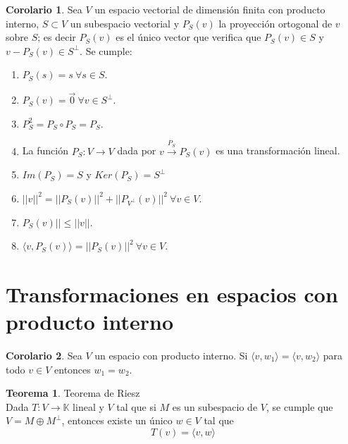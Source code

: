 \documentclass[10pt]{article}
\theoremstyle{definition}
\newtheorem{theorem}{Teorema}[section]
\newtheorem{corollary}{Corolario}[theorem]
\begin{document}
\begin{corollary}
    Sea $V$ un espacio vectorial de dimensión finita con producto interno, $S\subset V$ un subespacio vectorial y $P_S(v)$ la proyección ortogonal de $v$ sobre $S$; es decir $P_S(v)$ es el único vector que verifica que $P_S(v)\in S$ y $v-P_S(v)\in S^\bot$. Se cumple:
    \begin{enumerate}
        \item $P_S(s)=s\ \forall s\in S$.
        \item $P_S(v)=\vec{0}\ \forall v\in S^\bot$.
        \item $P_S^2=P_S\circ P_S=P_S$.
        \item La función $P_S:V\to V$ dada por $v\xrightarrow{P_{S}} P_{S}( v)$ es una transformación lineal.
        \item $Im(P_S)=S$ y $Ker(P_S)=S^\bot$
        \item $||v||^2=||P_S(v)||^2+||P_{V^\bot}(v)||^2\ \forall v\in V$.
        \item $P_S(v)||\le ||v||$.
        \item $\langle v,P_S(v)\rangle = ||P_S(v)||^2\ \forall v\in V$.
    \end{enumerate}
\end{corollary}\newpage
\section{Transformaciones en espacios con producto interno}
\begin{corollary}
    Sea $V$ un espacio con producto interno. Si $\langle v,w_1\rangle=\langle v,w_2\rangle$ para todo $v\in V$ entonces $w_1=w_2$.
\end{corollary}
\begin{theorem}{Teorema de Riesz}
    \\Dada $T:V\to\mathbb{K}$ lineal y $V$ tal que si $M$ es un subespacio de $V$, se cumple que $V=M\oplus M^\bot$, entonces existe un único $w\in V$ tal que $$T(v)=\langle v,w\rangle$$
\end{theorem}
\end{document}
